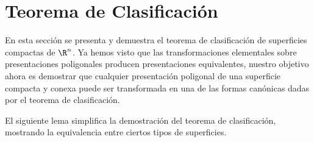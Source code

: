 

\section{Teorema de Clasificación}

En esta sección se presenta y demuestra el teorema de clasificación de superficies compactas de $\R^n$. Ya hemos visto que las transformaciones elementales sobre presentaciones poligonales producen presentaciones equivalentes, nuestro objetivo ahora es demostrar que cualquier presentación poligonal de una superficie compacta y conexa puede ser transformada en una de las formas canónicas dadas por el teorema de clasificación. \newline

El siguiente lema simplifica la demostración del teorema de clasificación, mostrando la equivalencia entre ciertos tipos de superficies.


